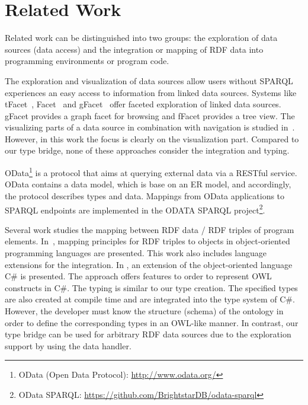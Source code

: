 \documentclass{llncs} %
\begin{document}
\section{Related Work}
\label{sec:rw}

Related work can be distinguished into two groups: the exploration of data sources (data access)
and the integration or mapping of RDF data into programming environments or program code.

The exploration and visualization of data sources 
allow users without SPARQL experiences an easy access to information from linked data sources.
Systems like tFacet~\cite{tFacet}, Facet~\cite{DBLP:conf/semweb/HildebrandOH06} and gFacet~\cite{heim2008gfacet}
offer faceted exploration of linked data sources. gFacet provides a graph facet for browsing
and  fFacet provides a tree view.
The  visualizing parts of a data source in combination with navigation is studied in~\cite{DBLP:conf/iv/DokulilK08}.
However, in this work the focus is clearly on the visualization part.
Compared to our type bridge, none of these approaches consider the integration and typing.

OData\footnote{OData (Open Data Protocol): \url{http://www.odata.org/}}  is a protocol that aims at querying external data via a RESTful service.
OData contains a data model, which is base on an ER model,
and accordingly, the protocol describes types and data.
Mappings from OData applications to SPARQL endpoints
are implemented in the ODATA SPARQL project\footnote{OData SPARQL: \url{https://github.com/BrightstarDB/odata-sparql}}.

Several work studies the mapping between RDF data / RDF triples of program elements.
In~\cite{oren2008}, mapping principles for RDF triples to objects in object-oriented programming languages are presented.
This work also includes language extensions for the integration.
In \cite{PaarV11}, an extension of the object-oriented language C\# is presented.
The approach offers features to order to represent OWL constructs in C\#.
The typing is similar to our type creation.
The specified types are also created at compile time
and are integrated into the type system of C\#. 
However, the developer must know the structure (schema) of the ontology in order
to define the corresponding types in an OWL-like manner. In contrast, our type bridge
can be used for arbitrary RDF data sources due to the exploration support by using the data handler.
\end{document}
